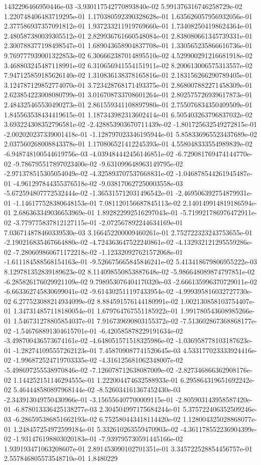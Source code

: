 1432296466950446e-03	-3.930117542770893840e-02	5.991376316746258729e-02	1.220748406483719295e-01	1.170380592390328628e-01	1.635626057956932056e-01	2.377586937357091812e-01	1.937233211919769660e-01	1.734082504198624364e-01	2.480587380039305512e-01	2.829936761660548084e-01	2.838080661345739331e-01	2.300788377198498547e-01	1.689043658904837708e-01	1.330565235866616736e-01	9.769777939001322853e-02	6.306662387014895510e-02	4.529900291216681918e-02	3.468803245487118991e-02	6.310656941554151911e-02	8.200613006575313557e-02	7.947125859185626140e-02	1.310836138378165816e-01	2.183156266290789405e-01	3.124787129852774070e-01	3.723428768171493375e-01	2.868007882271458309e-01	2.623854223008080799e-01	3.016708733708601264e-01	2.802575726939617873e-01	2.484325465530490273e-01	2.861559341108897980e-01	2.755076834350409509e-01	1.845563538434419615e-01	1.187343982313602414e-01	6.505403263796837032e-02	3.693224308352796581e-02	-2.428853903670711439e-02	-1.801725632549272815e-01	-2.002020237339001418e-01	-1.128797023346195944e-01	5.858336965523437689e-02	2.037560268008843378e-01	1.170806521412245393e-01	4.558048333554989839e-02	-6.948748100544619756e-03	-4.039484442456146851e-02	-6.729081769474144770e-02	-9.786795517897023400e-02	-9.631099648963149795e-02	-2.971378515305054049e-02	-4.325893707537668831e-02	-1.046878544261945487e-01	-4.961297844355376518e-02	-9.038170627250003558e-03	-5.672594807772532444e-02	-1.365315712031496542e-01	-2.469506392754879931e-01	-1.146177528380648153e-01	7.081120156687845113e-02	2.140149914819186594e-01	2.686363349036653969e-01	1.892822992516297043e-01	-5.719921786976472911e-02	-3.779775837812127115e-01	-2.072567892244634169e-01	7.036714878460339530e-03	3.166452200009460261e-01	2.752722323243753655e-01	-2.190216835467664880e-02	-4.724363647522240861e-02	-4.132932121295559286e-02	-7.280609860671172218e-02	-1.123320927621572068e-01	-1.611184588568154163e-01	-9.526675665845846241e-02	5.413418679806955222e-03	8.129781352839189623e-02	8.114098550853887648e-02	-5.986648089874797851e-02	-6.285826176029921109e-02	9.798953076404170320e-03	-2.666135996370729011e-02	-6.663362745830699041e-02	-9.614302511197433954e-02	-4.999395816032727730e-02	6.277523088214934099e-02	8.884591576144180991e-02	1.002130858103754407e-01	1.347314857118180054e-01	1.679764767551185922e-01	1.991780543608985266e-01	1.546731278805854037e-01	7.916739690803155372e-02	-7.513602867368868177e-02	-1.546768891304615701e-01	-6.420585878229191634e-02	-3.498700436573674161e-02	-4.648051571518325986e-02	-1.036958778103187623e-01	-1.282741095557262123e-01	7.458709087741520645e-03	4.533177023333924416e-02	-1.996872524719703335e-02	-4.316125681062348007e-02	-5.498697255538970846e-02	-7.126078712638087009e-02	-2.827346866362908176e-02	1.144252151146294555e-01	1.222004474632588933e-01	6.295864319651692242e-02	5.464448580897968144e-02	-8.526034161367452430e-03	-2.343913049750430966e-01	-3.156556407700009115e-01	-2.805903143958587420e-01	-6.878013336425138277e-03	2.304504997175684244e-01	5.375722406352509246e-03	-6.286595386851662193e-02	6.752580443418114420e-02	1.128004325028868077e-01	1.248457254972599184e-01	5.332610263559470903e-02	-4.361178552236904399e-02	-1.931476198803020183e-01	-7.939795730591445166e-02	1.939193471063208607e-01	2.891453090102701351e-01	3.345722528854456757e-01	2.557846805573548710e-01	1.8480229
